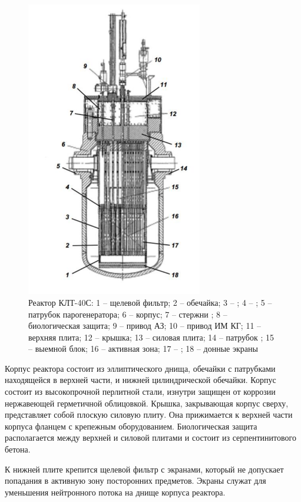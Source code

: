 \begin{figure}[!h]
	\center
	\includegraphics[height=13cm]{media/safe_3.png}
	\caption{Реактор КЛТ-40С:  1 – щелевой фильтр; 
		2 – обечайка; 
		3 – ; 
		4 –  ; 
		5 – патрубок парогенератора;  
		6 – корпус;  
		7 – стержни ;  
		8 – биологическая защита; 
		9 – привод  АЗ; 
		10 – привод ИМ КГ; 
		11 – верхняя плита;  
		12 – крышка; 
		13 – силовая плита; 
		14 – патрубок ;  
		15 – выемной блок;  
		16 – активная зона; 
		17 – ; 
		18 – донные экраны \cite{deev}}
	\label{conctruction klt}
\end{figure}

Корпус реактора состоит из эллиптического днища, обечайки с патрубками находящейся в верхней части, и нижней цилиндрической обечайки. Корпус состоит из высокопрочной перлитной стали, изнутри защищен от коррозии нержавеющей герметичной облицовкой. Крышка, закрывающая корпус сверху, представляет собой плоскую силовую плиту. Она прижимается к верхней части корпуса фланцем с крепежным оборудованием. Биологическая защита располагается между верхней и силовой плитами и состоит из серпентинитового бетона.

К нижней плите крепится щелевой фильтр с экранами, который не допускает попадания в активную зону посторонних предметов. Экраны служат для уменьшения нейтронного потока на днище корпуса реактора. 

